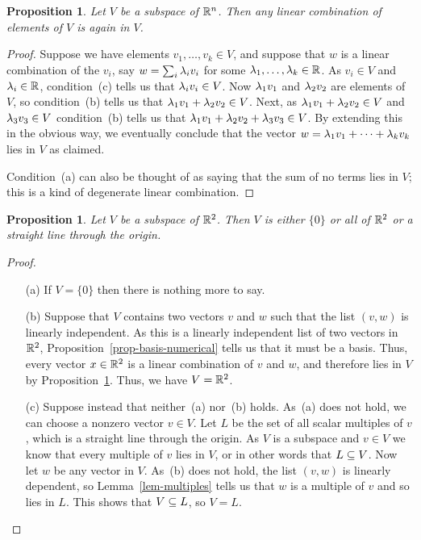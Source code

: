 \documentclass[reqno]{amsart}
\newtheorem{proposition}[theorem]{Proposition}
\theoremstyle{definition}
\begin{document}
\begin{proposition}\label{prop-subspace-lin-comb}
 Let $V$ be a subspace of ${\mathbb{R}}^n$.  Then any linear combination of
 elements of $V$ is again in $V$.
\end{proposition}
\begin{proof}
 Suppose we have elements $v_1,\dotsc,v_k\in V$, and suppose that $w$
 is a linear combination of the $v_i$, say $w=\sum_i\lambda_iv_i$ for some
 $\lambda_1,\dotsc,\lambda_k\in{\mathbb{R}}$.  As $v_i\in V$ and $\lambda_i\in{\mathbb{R}}$,
 condition~(c) tells us that $\lambda_iv_i\in V$.  Now $\lambda_1v_1$ and
 $\lambda_2v_2$ are elements of $V$, so condition~(b) tells us that
 $\lambda_1v_1+\lambda_2v_2\in V$.  Next, as $\lambda_1v_1+\lambda_2v_2\in V$ and
 $\lambda_3v_3\in V$ condition~(b) tells us that
 $\lambda_1v_1+\lambda_2v_2+\lambda_3v_3\in V$.  By extending this in the obvious
 way, we eventually conclude that the vector
 $w=\lambda_1v_1+\dotsb+\lambda_kv_k$ lies in $V$ as claimed.

 Condition~(a) can also be thought of as saying that the sum of no
 terms lies in $V$; this is a kind of degenerate linear combination.
\end{proof}

\begin{proposition}\label{prop-plane-subspaces}
 Let $V$ be a subspace of ${\mathbb{R}}^2$.  Then $V$ is either $\{0\}$ or all
 of ${\mathbb{R}}^2$ or a straight line through the origin.
\end{proposition}
\begin{proof}
 \begin{itemize}
  \item[(a)] If $V=\{0\}$ then there is nothing more to say.
  \item[(b)] Suppose that $V$ contains two vectors $v$ and $w$ such
   that the list $(v,w)$ is linearly independent.  As this is a
   linearly independent list of two vectors in ${\mathbb{R}}^2$,
   Proposition~\ref{prop-basis-numerical} tells us that it must be a
   basis.  Thus, every vector $x\in{\mathbb{R}}^2$ is a linear combination of
   $v$ and $w$, and therefore lies in $V$ by
   Proposition~\ref{prop-subspace-lin-comb}.  Thus, we have $V={\mathbb{R}}^2$.
  \item[(c)] Suppose instead that neither~(a) nor~(b) holds.  As~(a)
   does not hold, we can choose a nonzero vector $v\in V$.  Let $L$ be
   the set of all scalar multiples of $v$, which is a straight line
   through the origin.  As $V$ is a subspace and $v\in V$ we know that
   every multiple of $v$ lies in $V$, or in other words that
   $L\subseteq V$.  Now let $w$ be any vector in $V$.  As~(b) does
   not hold, the list $(v,w)$ is linearly dependent, so
   Lemma~\ref{lem-multiples} tells us that $w$ is a multiple of $v$
   and so lies in $L$.  This shows that $V\subseteq L$, so $V=L$.
 \end{itemize}
\end{proof}
\end{document}
